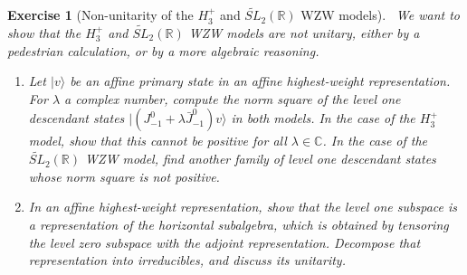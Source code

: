 \documentclass[12pt, a4paper, notitlepage, twoside]{report}
\numberwithin{equation}{section}
\theoremstyle{break}
\newtheorem{exo}{Exercise}[chapter]
\begin{document}
\begin{exo}[Non-unitarity of the $H_3^+$ and \texorpdfstring{$\widetilde{SL}_2(\mathbb{R})$}{SL2(R)} WZW models]
 ~\label{exonu}
We want to show that the $H_3^+$ and $\widetilde{SL}_2(\mathbb{R})$ WZW models are not unitary, either by a pedestrian calculation, or by a more algebraic reasoning. 
\begin{enumerate}
\item 
Let $|v\rangle$ be an affine primary state in an affine highest-weight representation. For $\lambda$ a complex number, compute the norm square of the level one descendant states  $|(J^0_{-1}+\lambda\bar{J}^0_{-1})v\rangle$ in both models. In the case of the $H_3^+$ model, show that this cannot be positive for all $\lambda\in\mathbb{C}$. In the case of the  $\widetilde{SL}_2(\mathbb{R})$ WZW model, find another family of level one descendant states whose norm square is not positive. 
\item
In an affine highest-weight representation, show that the level one subspace is a representation of the horizontal subalgebra, which is obtained by tensoring the level zero subspace with the adjoint representation. Decompose that representation into irreducibles, and discuss its unitarity. 
\end{enumerate}
\end{exo}





%

\printindex
\end{document}
